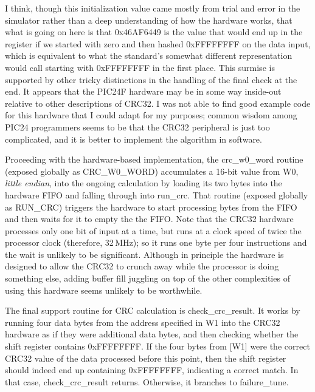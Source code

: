I think, though this initialization value came mostly from trial and error
in the simulator rather than a deep understanding of how the hardware works,
that what is going on here is that 0x46AF6449 is the value that would end up
in the register if we started with zero and then hashed 0xFFFFFFFF on the
data input, which is equivalent to what the standard's somewhat different
representation would call starting with 0xFFFFFFFF in the first place.  This
surmise is supported by other tricky distinctions in the handling of the
final check at the end.  It appears that the PIC24F hardware may be in some
way inside-out relative to other descriptions of CRC32.  I was not able to
find good example code for this hardware that I could adapt for my purposes;
common wisdom among PIC24 programmers seems to be that the CRC32 peripheral
is just too complicated, and it is better to implement the algorithm in
software.

Proceeding with the hardware-based implementation, the crc\_w0\_word routine
(exposed globally as CRC\_W0\_WORD) accumulates a 16-bit value from W0,
\emph{little endian}, into the ongoing calculation by loading its two bytes
into the hardware FIFO and falling through into run\_crc.  That routine
(exposed globally as RUN\_CRC) triggers the hardware to start processing
bytes from the FIFO and then waits for it to empty the the FIFO.  Note that
the CRC32 hardware processes only one bit of input at a time, but runs at a
clock speed of twice the processor clock (therefore, 32\,MHz); so it runs
one byte per four instructions and the wait is unlikely to be significant. 
Although in principle the hardware is designed to allow the CRC32 to crunch
away while the processor is doing something else, adding buffer fill
juggling on top of the other complexities of using this hardware seems
unlikely to be worthwhile.

The final support routine for CRC calculation is check\_crc\_result.  It
works by running four data bytes from the address specified in W1 into the
CRC32 hardware as if they were additional data bytes, and then checking
whether the shift register contains 0xFFFFFFFF.  If the four bytes from [W1]
were the correct CRC32 value of the data processed before this point, then
the shift register should indeed end up containing 0xFFFFFFFF, indicating a
correct match.  In that case, check\_crc\_result returns.  Otherwise, it
branches to failure\_tune.

